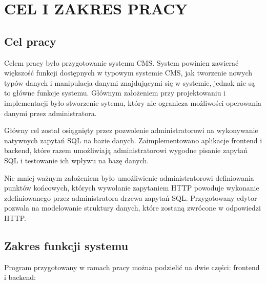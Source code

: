 \section{CEL I ZAKRES PRACY}

\subsection{Cel pracy}

Celem pracy było przygotowanie systemu CMS. System powinien zawierać większość
funkcji dostępnych w typowym systemie CMS, jak tworzenie nowych typów danych i
manipulacja danymi znajdującymi się w systemie, jednak nie są to główne funkcje
systemu. Głównym założeniem przy projektowaniu i implementacji było stworzenie
sytemu, który nie ogranicza możliwości operowania danymi przez administratora.

Główny cel został osiągnięty przez pozwolenie administratorowi na wykonywanie
natywnych zapytań SQL na bazie danych. Zaimplementowano aplikacje frontend i
backend, które razem umożliwiają administratorowi wygodne pisanie zapytań SQL i
testowanie ich wpływu na bazę danych.

Nie mniej ważnym założeniem było umożliwienie administratorowi definiowania
punktów końcowych, których wywołanie zapytaniem HTTP powoduje wykonanie
zdefiniowanego przez administratora drzewa zapytań SQL. Przygotowany edytor
pozwala na modelowanie struktury danych, które zostaną zwrócone w odpowiedzi
HTTP.

\subsection{Zakres funkcji systemu}

Program przygotowany w ramach pracy można podzielić na dwie części: frontend i
backend:


